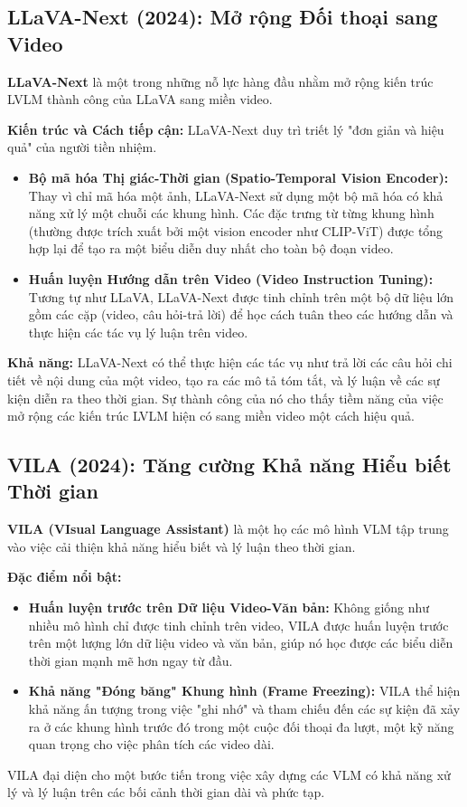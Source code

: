 \subsection{LLaVA-Next (2024): Mở rộng Đối thoại sang Video}
\label{subsec:llava_next}
\textbf{LLaVA-Next} \cite{Liu2024_LLaVANext} là một trong những nỗ lực hàng đầu nhằm mở rộng kiến trúc LVLM thành công của LLaVA sang miền video.

\textbf{Kiến trúc và Cách tiếp cận:}
LLaVA-Next duy trì triết lý "đơn giản và hiệu quả" của người tiền nhiệm.
\begin{itemize}
	\item \textbf{Bộ mã hóa Thị giác-Thời gian (Spatio-Temporal Vision Encoder):} Thay vì chỉ mã hóa một ảnh, LLaVA-Next sử dụng một bộ mã hóa có khả năng xử lý một chuỗi các khung hình. Các đặc trưng từ từng khung hình (thường được trích xuất bởi một vision encoder như CLIP-ViT) được tổng hợp lại để tạo ra một biểu diễn duy nhất cho toàn bộ đoạn video.
	\item \textbf{Huấn luyện Hướng dẫn trên Video (Video Instruction Tuning):} Tương tự như LLaVA, LLaVA-Next được tinh chỉnh trên một bộ dữ liệu lớn gồm các cặp (video, câu hỏi-trả lời) để học cách tuân theo các hướng dẫn và thực hiện các tác vụ lý luận trên video.
\end{itemize}
\textbf{Khả năng:} LLaVA-Next có thể thực hiện các tác vụ như trả lời các câu hỏi chi tiết về nội dung của một video, tạo ra các mô tả tóm tắt, và lý luận về các sự kiện diễn ra theo thời gian. Sự thành công của nó cho thấy tiềm năng của việc mở rộng các kiến trúc LVLM hiện có sang miền video một cách hiệu quả.

\subsection{VILA (2024): Tăng cường Khả năng Hiểu biết Thời gian}
\label{subsec:vila}
\textbf{VILA (VIsual Language Assistant)} \cite{Lin2024_VILA} là một họ các mô hình VLM tập trung vào việc cải thiện khả năng hiểu biết và lý luận theo thời gian.

\textbf{Đặc điểm nổi bật:}
\begin{itemize}
	\item \textbf{Huấn luyện trước trên Dữ liệu Video-Văn bản:} Không giống như nhiều mô hình chỉ được tinh chỉnh trên video, VILA được huấn luyện trước trên một lượng lớn dữ liệu video và văn bản, giúp nó học được các biểu diễn thời gian mạnh mẽ hơn ngay từ đầu.
	\item \textbf{Khả năng "Đóng băng" Khung hình (Frame Freezing):} VILA thể hiện khả năng ấn tượng trong việc "ghi nhớ" và tham chiếu đến các sự kiện đã xảy ra ở các khung hình trước đó trong một cuộc đối thoại đa lượt, một kỹ năng quan trọng cho việc phân tích các video dài.
\end{itemize}
VILA đại diện cho một bước tiến trong việc xây dựng các VLM có khả năng xử lý và lý luận trên các bối cảnh thời gian dài và phức tạp.

